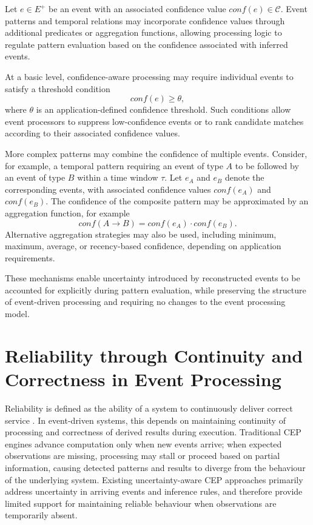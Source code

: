 Let $e \in E^{+}$ be an event with an associated confidence value $conf(e) \in \mathcal{C}$. Event patterns and temporal relations may incorporate confidence values through additional predicates or aggregation functions, allowing processing logic to regulate pattern evaluation based on the confidence associated with inferred events.

At a basic level, confidence-aware processing may require individual events to satisfy a threshold condition
\begin{equation}
conf(e) \ge \theta ,
\end{equation}
\noindent
where $\theta$ is an application-defined confidence threshold. Such conditions allow event processors to suppress low-confidence events or to rank candidate matches according to their associated confidence values.

More complex patterns may combine the confidence of multiple events. Consider, for example, a temporal pattern requiring an event of type $A$ to be followed by an event of type $B$ within a time window $\tau$. Let $e_A$ and $e_B$ denote the corresponding events, with associated confidence values $conf(e_A)$ and $conf(e_B)$. The confidence of the composite pattern may be approximated by an aggregation function, for example
\begin{equation}
conf(A \rightarrow B) = conf(e_A) \cdot conf(e_B).
\end{equation}
Alternative aggregation strategies may also be used, including minimum, maximum, average, or recency-based confidence, depending on application requirements.

These mechanisms enable uncertainty introduced by reconstructed events to be accounted for explicitly during pattern evaluation, while preserving the structure of event-driven processing and requiring no changes to the event processing model. 


\section{Reliability through Continuity and Correctness in Event Processing}
\label{sec:reliability-implications}
Reliability is defined as the ability of a system to continuously deliver correct service \citep{avizienis2004basic}. In event-driven systems, this depends on maintaining continuity of processing and correctness of derived results during execution. Traditional CEP engines advance computation only when new events arrive; when expected observations are missing, processing may stall or proceed based on partial information, causing detected patterns and results to diverge from the behaviour of the underlying system. Existing uncertainty-aware CEP approaches primarily address uncertainty in arriving events and inference rules, and therefore provide limited support for maintaining reliable behaviour when observations are temporarily absent.

